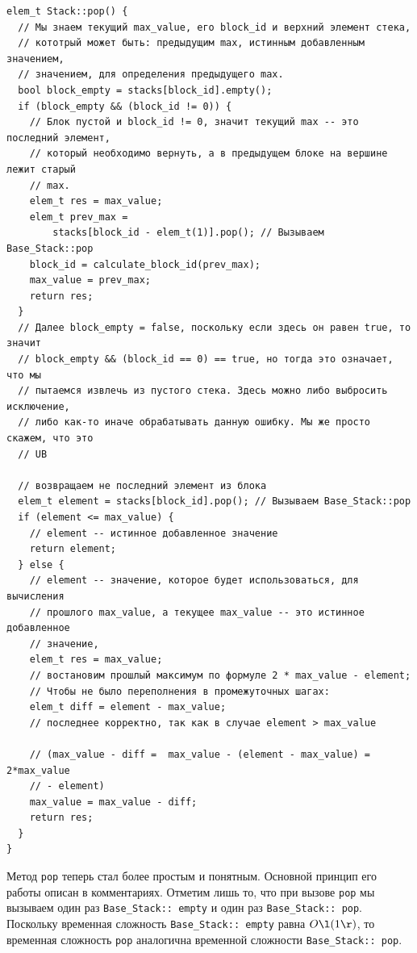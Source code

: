 \begin{verbatim}
elem_t Stack::pop() {
  // Мы знаем текущий max_value, его block_id и верхний элемент стека,
  // кототрый может быть: предыдущим max, истинным добавленным значением,
  // значением, для определения предыдущего max.
  bool block_empty = stacks[block_id].empty();
  if (block_empty && (block_id != 0)) {
    // Блок пустой и block_id != 0, значит текущий max -- это последний элемент,
    // который необходимо вернуть, а в предыдущем блоке на вершине лежит старый
    // max.
    elem_t res = max_value;
    elem_t prev_max =
        stacks[block_id - elem_t(1)].pop(); // Вызываем Base_Stack::pop
    block_id = calculate_block_id(prev_max);
    max_value = prev_max;
    return res;
  }
  // Далее block_empty = false, поскольку если здесь он равен true, то значит
  // block_empty && (block_id == 0) == true, но тогда это означает, что мы
  // пытаемся извлечь из пустого стека. Здесь можно либо выбросить исключение,
  // либо как-то иначе обрабатывать данную ошибку. Мы же просто скажем, что это
  // UB

  // возвращаем не последний элемент из блока
  elem_t element = stacks[block_id].pop(); // Вызываем Base_Stack::pop
  if (element <= max_value) {
    // element -- истинное добавленное значение
    return element;
  } else {
    // element -- значение, которое будет использоваться, для вычисления
    // прошлого max_value, а текущее max_value -- это истинное добавленное
    // значение,
    elem_t res = max_value;
    // востановим прошлый максимум по формуле 2 * max_value - element;
    // Чтобы не было переполнения в промежуточных шагах:
    elem_t diff = element - max_value;
    // последнее корректно, так как в случае element > max_value

    // (max_value - diff =  max_value - (element - max_value) = 2*max_value
    // - element)
    max_value = max_value - diff;
    return res;
  }
}
\end{verbatim}
Метод \texttt{pop} теперь стал более простым и понятным. Основной принцип его работы описан в комментариях. Отметим лишь то, что при вызове \texttt{pop} мы вызываем один раз \texttt{Base_Stack:: empty} и один раз \texttt{Base_Stack:: pop}. Поскольку временная сложность \texttt{Base_Stack:: empty} равна \(O\l(1\r)\), то временная сложность \texttt{pop} аналогична временной сложности \texttt{Base_Stack:: pop}.

